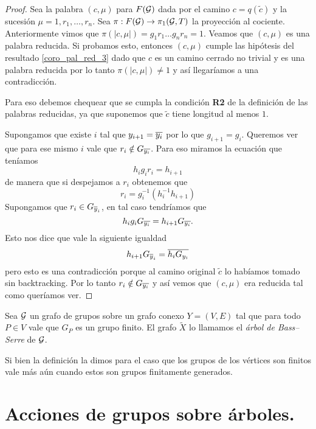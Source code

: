 \documentclass[tesis.tex]{subfiles}
\begin{document}
\begin{proof}
	
	Sea la palabra $(c, \mu)$ para $F({\cal G})$ dada por el camino $c= q(\tilde c)$ y la sucesión $\mu = 1,r_1, \dots, r_n$.
	Sea $\pi:F({\cal G}) \to \pi_1({\cal G},T)$ la proyección al cociente.
	Anteriormente vimos que $\pi(|c, \mu|) = g_1r_1\dots g_nr_n = 1$.
	Veamos que $(c, \mu)$ es una palabra reducida.
	Si probamos esto, entonces $(c, \mu)$ cumple las hipótesis del resultado \ref{coro_pal_red_3} dado que $c$ es un camino cerrado no trivial y es una palabra reducida por lo tanto $\pi(|c, \mu|) \neq 1$ y así llegaríamos a una contradicción.

	Para eso debemos chequear que se cumpla la condición \textbf{R2} de la definición de las palabras reducidas, ya que suponemos que $\tilde c$ tiene longitud al menos $1$.
	
	Supongamos que existe $i$ tal que $y_{i+1} = \overline{y_i}$ por lo que $g_{i+1} = g_{i}$.
	Queremos ver que para ese mismo $i$ vale que $r_i \notin G_{\overline{y_{i}}}$.
	Para eso miramos la ecuación que teníamos 
	\[
		h_ig_ir_i = h_{i+1}
	\]
	de manera que si despejamos a $r_{i}$ obtenemos que
	\[
		r_i =   g_i^{-1}(h_i^{-1} h_{i+1} )
	\]
	Supongamos que $r_{i} \in G_{\overline y_{i}}$, en tal caso tendríamos que 
	\[
		h_ig_i G_{\overline{y_i}} = h_{i+1}G_{\overline{y_i}}.
	\] 
	Esto nos dice que vale la siguiente igualdad 
	\[
	h_{i+1}G_{\overline y_{i}} = \overline{h_{i}G_{y_i}}
	\]
	pero esto es una contradicción porque al camino original $\tilde c$ lo habíamos tomado sin backtracking. 
	Por lo tanto $r_{i} \notin G_{\overline{y_{i}}}$ y así vemos que $(c, \mu)$ era reducida tal como queríamos ver.
	
\end{proof}



\begin{deff}
	Sea ${\cal G}$ un grafo de grupos sobre un grafo conexo $Y=(V,E)$ tal que para todo $P \in V$ vale que $G_{P}$ es un grupo finito.	
	El grafo $\tilde X$ lo llamamos el \emph{árbol de Bass--Serre} de ${\cal G}$.
\end{deff}

Si bien la definición la dimos para el caso que los grupos de los vértices son finitos vale más aún cuando estos son grupos finitamente generados.

\begin{center}
\end{center}
	
\section{Acciones de grupos sobre árboles.}\label{secc_acciones_arboles}
\end{document}
